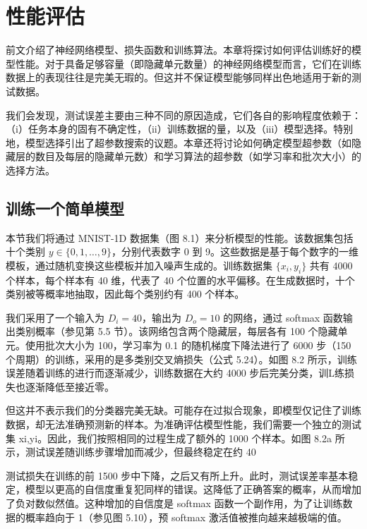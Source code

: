 \chapter{性能评估}

前文介绍了神经网络模型、损失函数和训练算法。本章将探讨如何评估训练好的模型性能。对于具备足够容量（即隐藏单元数量）的神经网络模型而言，它们在训练数据上的表现往往是完美无瑕的。但这并不保证模型能够同样出色地适用于新的测试数据。

我们会发现，测试误差主要由三种不同的原因造成，它们各自的影响程度依赖于：（i）任务本身的固有不确定性，（ii）训练数据的量，以及（iii）模型选择。特别地，模型选择引出了超参数搜索的议题。本章还将讨论如何确定模型超参数（如隐藏层的数目及每层的隐藏单元数）和学习算法的超参数（如学习率和批次大小）的选择方法。
\section{训练一个简单模型}
本节我们将通过 MNIST-1D 数据集（图 8.1）来分析模型的性能。该数据集包括十个类别 \(y \in \{0,1,\ldots,9\}\)，分别代表数字 0 到 9。这些数据是基于每个数字的一维模板，通过随机变换这些模板并加入噪声生成的。训练数据集 \(\{x_i, y_i\}\) 共有 4000 个样本，每个样本有 40 维，代表了 40 个位置的水平偏移。在生成数据时，十个类别被等概率地抽取，因此每个类别约有 400 个样本。

我们采用了一个输入为 \(D_i = 40\)，输出为 \(D_o = 10\) 的网络，通过 softmax 函数输出类别概率（参见第 5.5 节）。该网络包含两个隐藏层，每层各有 100 个隐藏单元。使用批次大小为 100，学习率为 0.1 的随机梯度下降法进行了 6000 步（150 个周期）的训练，采用的是多类别交叉熵损失（公式 5.24）。如图 8.2 所示，训练误差随着训练的进行而逐渐减少，训练数据在大约 4000 步后完美分类，训L练损失也逐渐降低至接近零。

但这并不表示我们的分类器完美无缺。可能存在过拟合现象，即模型仅记住了训练数据，却无法准确预测新的样本。为准确评估模型性能，我们需要一个独立的测试集 {xi,yi}。因此，我们按照相同的过程生成了额外的 1000 个样本。如图 8.2a 所示，测试误差随训练步骤增加而减少，但最终稳定在约 40%

测试损失在训练的前 1500 步中下降，之后又有所上升。此时，测试误差率基本稳定，模型以更高的自信度重复犯同样的错误。这降低了正确答案的概率，从而增加了负对数似然值。这种增加的自信度是 softmax 函数一个副作用，为了让训练数据的概率趋向于 1（参见图 5.10），预 softmax 激活值被推向越来越极端的值。

